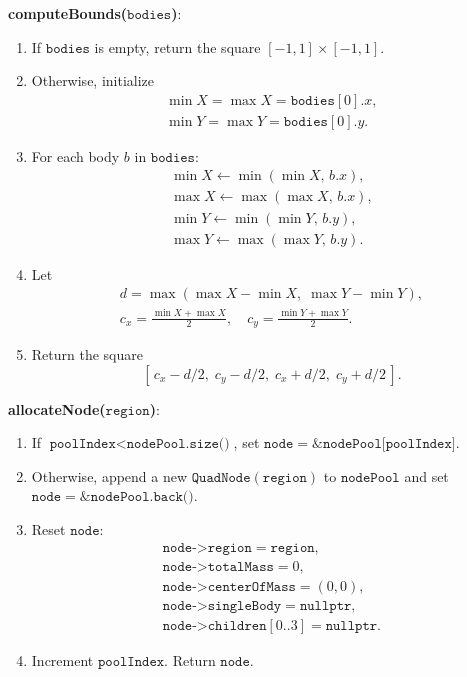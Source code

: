 \documentclass{article}
\begin{document}
\noindent\textbf{computeBounds(\(\texttt{bodies}\))}: 
\begin{enumerate}
    \item If \(\texttt{bodies}\) is empty, return the square \([-1,1]\times[-1,1]\).
    \item Otherwise, initialize 
    \[
    \begin{array}{l}
      \min X = \max X = \texttt{bodies}[0].x,\\
      \min Y = \max Y = \texttt{bodies}[0].y.
    \end{array}
    \]
    \item For each body \(b\) in \(\texttt{bodies}\):
    \[
    \begin{array}{l}
      \min X \leftarrow \min(\min X,\,b.x),\\
      \max X \leftarrow \max(\max X,\,b.x),\\
      \min Y \leftarrow \min(\min Y,\,b.y),\\
      \max Y \leftarrow \max(\max Y,\,b.y).
    \end{array}
    \]
    \item Let 
    \[
    \begin{array}{l}
      d = \max(\max X - \min X,\;\max Y - \min Y), \\ 
      c_x = \tfrac{\min X + \max X}{2}, \quad
      c_y = \tfrac{\min Y + \max Y}{2}.
    \end{array}
    \]
    \item Return the square 
    \[
    [\,c_x - d/2,\;c_y - d/2,\;c_x + d/2,\;c_y + d/2\,].
    \]
\end{enumerate}

\vspace{1ex}
\noindent\textbf{allocateNode(\(\texttt{region}\))}: 
\begin{enumerate}
  \item If \(\texttt{poolIndex} < \texttt{nodePool.size()}\), set 
    \(\texttt{node} = \&\texttt{nodePool[poolIndex]}\).
  \item Otherwise, append a new \(\texttt{QuadNode}(\texttt{region})\) to \(\texttt{nodePool}\) and set 
    \(\texttt{node} = \&\texttt{nodePool.back()}\).
  \item Reset \(\texttt{node}\):
    \[
    \begin{array}{l}
      \texttt{node->region}        = \texttt{region},\\
      \texttt{node->totalMass}     = 0,\\
      \texttt{node->centerOfMass}  = (0,0),\\
      \texttt{node->singleBody}    = \texttt{nullptr},\\
      \texttt{node->children}[0..3] = \texttt{nullptr}.
    \end{array}
    \]
  \item Increment \(\texttt{poolIndex}\). Return \(\texttt{node}\).
\end{enumerate}
\end{document}
